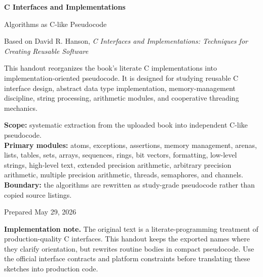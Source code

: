 \documentclass[11pt]{article}
\begin{document}
\hypersetup{pageanchor=false}

\begin{titlepage}
  \centering
  \vspace*{1.5cm}
  {\Huge\bfseries\color{CIIBlue}C Interfaces and Implementations\par}
  \vspace{0.35cm}
  {\LARGE Algorithms as C-like Pseudocode\par}
  \vspace{0.25cm}
  {\large Based on David R. Hanson, \textit{C Interfaces and Implementations: Techniques for Creating Reusable Software}\par}
  \vspace{0.95cm}
  \begin{scopebox}
  This handout reorganizes the book's literate C implementations into implementation-oriented pseudocode. It is designed for studying reusable C interface design, abstract data type implementation, memory-management discipline, string processing, arithmetic modules, and cooperative threading mechanics.
  \end{scopebox}
  \vspace{0.75cm}
  \begin{methodbox}
  \textbf{Scope:} systematic extraction from the uploaded book into independent C-like pseudocode.\\
  \textbf{Primary modules:} atoms, exceptions, assertions, memory management, arenas, lists, tables, sets, arrays, sequences, rings, bit vectors, formatting, low-level strings, high-level text, extended precision arithmetic, arbitrary precision arithmetic, multiple precision arithmetic, threads, semaphores, and channels.\\
  \textbf{Boundary:} the algorithms are rewritten as study-grade pseudocode rather than copied source listings.
  \end{methodbox}
  \vfill
  {\large Prepared May 29, 2026\par}
\end{titlepage}

\hypersetup{pageanchor=true}
\tableofcontents
\clearpage
{}

\begin{warningbox}
\textbf{Implementation note.} The original text is a literate-programming treatment of production-quality C interfaces. This handout keeps the exported names where they clarify orientation, but rewrites routine bodies in compact pseudocode. Use the official interface contracts and platform constraints before translating these sketches into production code.
\end{warningbox}
\end{document}

